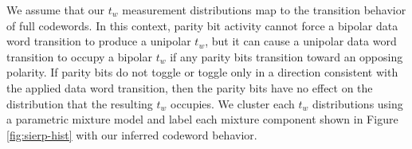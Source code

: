 We assume that our $t_w$ measurement distributions map to the transition behavior of full codewords. In this context, parity bit activity cannot force a bipolar data word transition to produce a unipolar $t_w$, but it can cause a unipolar data word transition to occupy a bipolar $t_w$ if any parity bits transition toward an opposing polarity. If parity bits do not toggle or toggle only in a direction consistent with the applied data word transition, then the parity bits have no effect on the distribution that the resulting $t_w$ occupies. We cluster each $t_w$ distributions using a parametric mixture model and label each mixture component shown in Figure \ref{fig:sierp-hist} with our inferred codeword behavior.

% 


